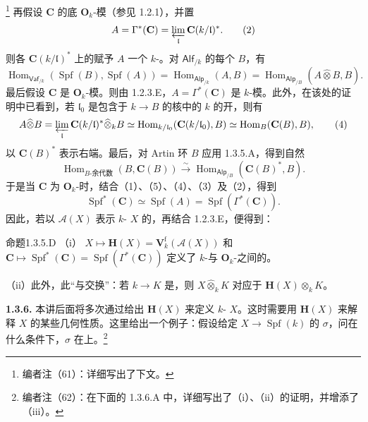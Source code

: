 \footnote{编者注（61）：详细写出了下文。} 再假设 $\mathbf C$ 的底 $\mathbf O_k$-模（参见 1.2.1），并置
\[
 A=\Gamma^*(\mathbf C)=\varprojlim_{\mathfrak l}\mathbf C(k/\mathfrak l)^*.\tag{2}
\]
则各 $\mathbf C(k/\mathfrak l)^*$ 上的赋予 $A$ 一个 $k$-。对 $\mathsf{Alf}_{/k}$ 的每个 $B$，有
\[
 \operatorname{Hom}_{\mathsf{Vaf}_{/k}}(\operatorname{Spf}(B),\operatorname{Spf}(A))
 =\operatorname{Hom}_{\mathsf{Alp}_{/k}}(A,B)
 =\operatorname{Hom}_{\mathsf{Alp}_{/B}}(A\widehat\otimes B,B).\tag{3}
\]
最后假设 $\mathbf C$ 是 $\mathbf O_k$-模。则由 1.2.3.E，$A=\Gamma^*(\mathbf C)$ 是 $k$-模。此外，在该处的证明中已看到，若 $\mathfrak l_0$ 是包含于 $k\to B$ 的核中的 $k$ 的开，则有
\[
 A\widehat\otimes B=\varprojlim_{\mathfrak l}\mathbf C(k/\mathfrak l)^*\widehat\otimes_k B
 \simeq\operatorname{Hom}_{k/\mathfrak l_0}(\mathbf C(k/\mathfrak l_0),B)
 \simeq\operatorname{Hom}_B(\mathbf C(B),B),\tag{4}
\]
以 $\mathbf C(B)^*$ 表示右端。最后，对 Artin 环 $B$ 应用 1.3.5.A，得到自然
\[
 \operatorname{Hom}_{B\text{-余代数}}(B,\mathbf C(B))\xrightarrow{\sim}
 \operatorname{Hom}_{\mathsf{Alp}_{/B}}(\mathbf C(B)^*,B).\tag{5}
\]
于是当 $\mathbf C$ 为 $\mathbf O_k$-时，结合（1）、（5）、（4）、（3）及（2），得到
\[
 \operatorname{Spf}^*(\mathbf C)\simeq\operatorname{Spf}(A)=\operatorname{Spf}(\Gamma^*(\mathbf C)).\tag{$\star$}
\]
因此，若以 $\mathscr A(X)$ 表示 $k$- $X$ 的，再结合 1.2.3.E，便得到：
\begin{SGAresult}{命题}{1.3.5.D}
（i） $X\mapsto\mathbf H(X)=\mathbf V_k^{\mathrm f}(\mathscr A(X))$ 和 $\mathbf C\mapsto\operatorname{Spf}^*(\mathbf C)=\operatorname{Spf}(\Gamma^*(\mathbf C))$ 定义了 $k$-与 $\mathbf O_k$-之间的。

（ii）此外，此“与交换”：若 $k\to K$ 是，则 $X\widehat\otimes_k K$ 对应于 $\mathbf H(X)\otimes_k K$。
\end{SGAresult}
\textbf{1.3.6.} 本讲后面将多次通过给出 $\mathbf H(X)$ 来定义 $k$- $X$。这时需要用 $\mathbf H(X)$ 来解释 $X$ 的某些几何性质。这里给出一个例子：假设给定 $X\to\operatorname{Spf}(k)$ 的 $\sigma$，问在什么条件下，$\sigma$ 在上。\footnote{编者注（62）：在下面的 1.3.6.A 中，详细写出了（i）、（ii）的证明，并增添了（iii）。}


